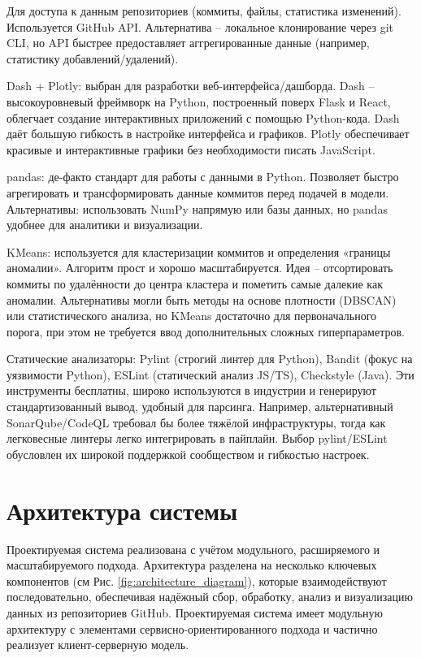 Для доступа к данным репозиториев (коммиты, файлы, статистика изменений). Используется GitHub API. Альтернатива – локальное клонирование через git CLI, но API быстрее предоставляет аггрегированные данные (например, статистику добавлений/удалений).

Dash + Plotly: выбран для разработки веб-интерфейса/дашборда. Dash – высокоуровневый фреймворк на Python, построенный поверх Flask и React, облегчает создание интерактивных приложений с помощью Python-кода. Dash даёт большую гибкость в настройке интерфейса и графиков. Plotly обеспечивает красивые и интерактивные графики без необходимости писать JavaScript.

pandas: де-факто стандарт для работы с данными в Python. Позволяет быстро агрегировать и трансформировать данные коммитов перед подачей в модели. Альтернативы: использовать NumPy напрямую или базы данных, но pandas удобнее для аналитики и визуализации.

KMeans: используется для кластеризации коммитов и определения «границы аномалии». Алгоритм прост и хорошо масштабируется. Идея – отсортировать коммиты по удалённости до центра кластера и пометить самые далекие как аномалии. Альтернативы могли быть методы на основе плотности (DBSCAN) или статистического анализа, но KMeans достаточно для первоначального порога, при этом не требуется ввод дополнительных сложных гиперпараметров.

Статические анализаторы: Pylint (строгий линтер для Python), Bandit (фокус на уязвимости Python), ESLint (статический анализ JS/TS), Checkstyle (Java). Эти инструменты бесплатны, широко используются в индустрии и генерируют стандартизованный вывод, удобный для парсинга. Например, альтернативный SonarQube/CodeQL требовал бы более тяжёлой инфраструктуры, тогда как легковесные линтеры легко интегрировать в пайплайн. Выбор pylint/ESLint обусловлен их широкой поддержкой сообществом и гибкостью настроек.

\section{Архитектура системы} \label{ch2:2.4}

Проектируемая система реализована с учётом модульного, расширяемого и масштабируемого подхода. Архитектура разделена на несколько ключевых компонентов (см Рис. \ref{fig:architecture_diagram}), которые взаимодействуют последовательно, обеспечивая надёжный сбор, обработку, анализ и визуализацию данных из репозиториев GitHub. Проектируемая система имеет модульную архитектуру с элементами сервисно-ориентированного подхода и частично реализует клиент-серверную модель.

